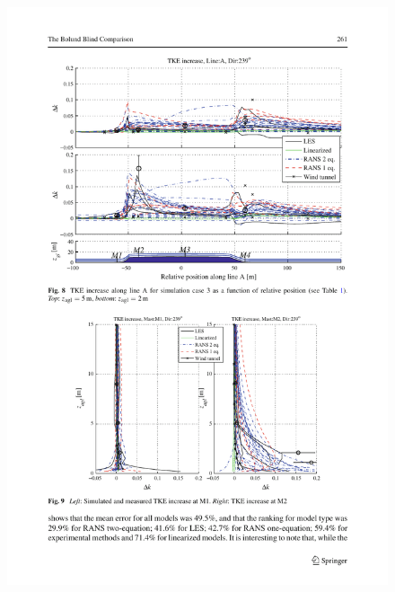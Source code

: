 \begin{figure}[H]
	\centering
	\includegraphics[width=1\linewidth,trim={2.7cm 3.8cm 1.9cm 12.5cm},clip]{bolund4.pdf}%
	

\end{figure}
